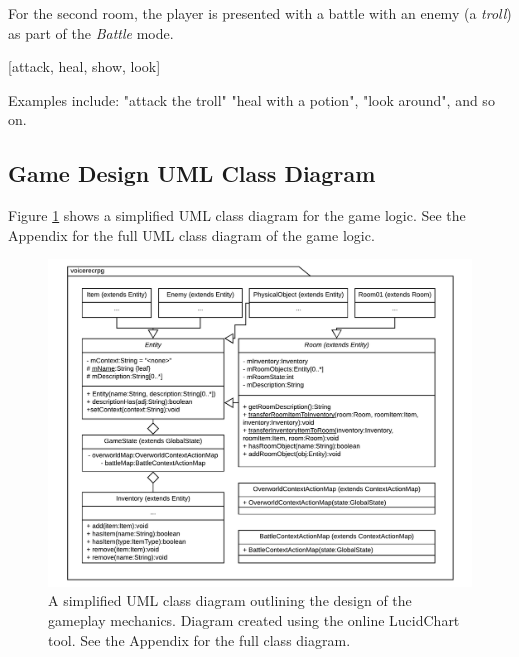 \documentclass[11pt]{article}
\begin{document}
For the second room, the player is presented with a battle with an enemy (a \textit{troll}) as part of the \textit{Battle} mode.

\begin{center}
[attack, heal, show, look]
\end{center}

Examples include: "attack the troll" "heal with a potion", "look around", and so on.

\subsection{Game Design UML Class Diagram}

Figure \ref{fig:game-overview} shows a simplified UML class diagram for the game logic. See the Appendix for the full UML class diagram of the game logic.

\begin{center}
\begin{figure}[H]
\begin{center}
  \includegraphics[width=\linewidth]{game-overview.pdf}
  \caption{A simplified UML class diagram outlining the design of the gameplay mechanics. Diagram created using the online LucidChart tool. See the Appendix for the full class diagram.}
  \label{fig:game-overview}
  \end{center}
\end{figure}
\end{center}
\end{document}
